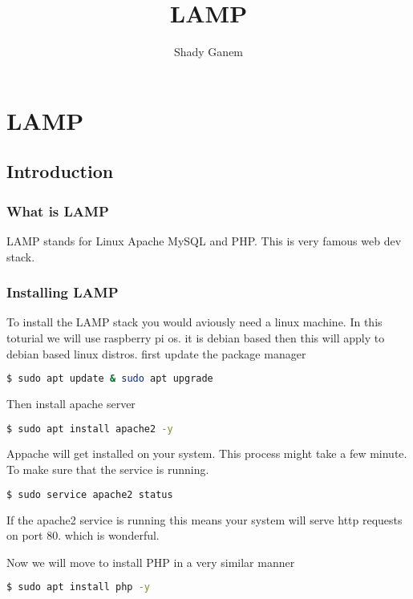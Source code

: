 \documentclass{book}
\title{LAMP}
\author{Shady Ganem}
\begin{document}
\maketitle
{
\hypersetup{linkcolor=black}
\tableofcontents
}

\part{LAMP}

\chapter{Introduction}
\section{What is LAMP}
LAMP stands for Linux Apache MySQL and PHP. This is very famous web dev 
stack. 

\section{Installing LAMP}
To install the LAMP stack you would aviously need a linux machine. 
In this toturial we will use raspberry pi os. it is debian based then this 
will apply to debian based linux distros.
first update the package manager
\begin{lstlisting}[language=bash]
$ sudo apt update & sudo apt upgrade
\end{lstlisting}
Then install apache server 
\begin{lstlisting}[language=bash]
$ sudo apt install apache2 -y 
\end{lstlisting}
Appache will get installed on your system. This process might take a few minute.\\
To make sure that the service is running. 
\begin{lstlisting}[language=bash]
$ sudo service apache2 status 
\end{lstlisting}
If the apache2 service is running this means your system will serve http requests on port 80. which is wonderful.\par
Now we will move to install PHP
in a very similar manner 
\begin{lstlisting}[language=bash]
$ sudo apt install php -y 
\end{lstlisting}
\end{document}
